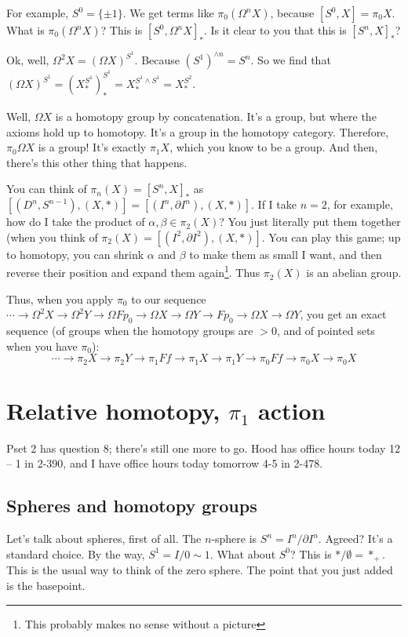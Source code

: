 For example, $S^0=\{\pm 1\}$. We get terms like $\pi_0(\Omega^n X)$, because $[S^0,X] = \pi_0 X$. What is $\pi_0(\Omega^n X)$? This is $[S^0,\Omega^n X]_\ast$. Is it clear to you that this is $[S^n,X]_\ast$?

Ok, well, $\Omega^2 X = (\Omega X)^{S^1}$. Because $(S^1)^{\wedge n} = S^n$. So we find that $(\Omega X)^{S^1} = (X^{S^1}_\ast)^{S^1}_\ast = X_\ast^{S^1\wedge S^1} = X_\ast^{S^2}$.

Well, $\Omega X$ is a homotopy group by concatenation. It's a group, but where the axioms hold up to homotopy. It's a group in the homotopy category. Therefore, $\pi_0 \Omega X$ is a group! It's exactly $\pi_1 X$, which you know to be a group. And then, there's this other thing that happens.

You can think of $\pi_n(X) = [S^n,X]_\ast$ as $[(D^n,S^{n-1}),(X,\ast)] = [(I^n,\partial I^n),(X,\ast)]$. If I take $n=2$, for example, how do I take the product of $\alpha,\beta\in \pi_2(X)$? You just literally put them together (when you think of $\pi_2(X) = [(I^2,\partial I^2),(X,\ast)]$. You can play this game; up to homotopy, you can shrink $\alpha$ and $\beta$ to make them as small I want, and then reverse their position and expand them again\footnote{This probably makes no sense without a picture}. Thus $\pi_2(X)$ is an abelian group.

Thus, when you apply $\pi_0$ to our sequence $\cdots\to\Omega^2 X\to\Omega^2 Y\to \Omega Fp_0\to \Omega X\to \Omega Y\to Fp_0\to \Omega X\to \Omega Y$, you get an exact sequence (of groups when the homotopy groups are $>0$, and of pointed sets when you have $\pi_0$):
$$\cdots\to \pi_2 X\to \pi_2 Y\to \pi_1 Ff\to \pi_1 X\to\pi_1 Y\to\pi_0 Ff\to\pi_0 X\to \pi_0 X$$
\section{Relative homotopy, $\pi_1$ action}
Pset 2 has question 8; there's still one more to go. Hood has office hours today 12 -- 1 in 2-390, and I have office hours today tomorrow 4-5 in 2-478.
\subsection{Spheres and homotopy groups}
Let's talk about spheres, first of all. The $n$-sphere is $S^n=I^n/\partial I^n$. Agreed? It's a standard choice. By the way, $S^1 = I/0\sim 1$. What about $S^0$? This is $\ast/\emptyset = \ast_+$. This is the usual way to think of the zero sphere. The point that you just added is the basepoint.

